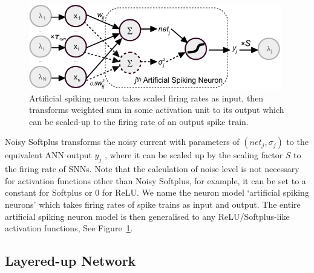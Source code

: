 	\begin{figure}[bt!]
		\centering
		\includegraphics[width=0.98\textwidth]{pics_iconip/neuron_o.pdf}
		\caption{Artificial spiking neuron takes scaled firing rates as input, then transforms weighted sum in some activation unit to its output which can be scaled-up to the firing rate of an output spike train.}
		\label{Fig:sneuron}
	\end{figure}
	
	Noisy Softplus transforms the noisy current with parameters of $(net_j, \sigma_j)$ to the equivalent ANN output $y_j$ , where it can be scaled up by the scaling factor $S$ to the firing rate of SNNs.
	Note that the calculation of noise level is not necessary for activation functions other than Noisy Softplus, for example, it can be set to a constant for Softplus or 0 for ReLU.
	We name the neuron model `artificial spiking neurons' which takes firing rates of spike trains as input and output. 
	The entire artificial spiking neuron model is then generalised to any ReLU/Softplus-like activation functions, See Figure~\ref{Fig:sneuron}.
	

	
	
	\subsection{Layered-up Network}
	
